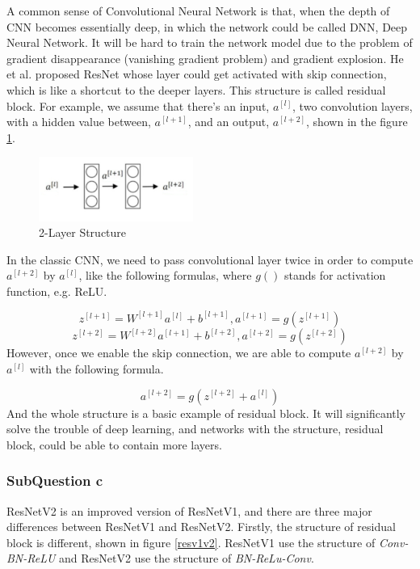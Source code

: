 \documentclass[conference]{IEEEtran}
\begin{document}
A common sense of Convolutional Neural Network is that, when the depth of CNN becomes essentially deep, in which the network could be called DNN, Deep Neural Network. It will be hard to train the network model due to the problem of gradient disappearance (vanishing gradient problem) and gradient explosion. He et al.\cite{resnet} proposed ResNet whose layer could get activated with skip connection, which is like a shortcut to the deeper layers. This structure is called residual block. For example, we assume that there's an input, $a^{[l]}$, two convolution layers, with a hidden value between, $a^{[l+1]}$, and an output, $a^{[l+2]}$, shown in the figure \ref{resex}\cite{wu}.

\begin{figure}[h] 
    \centering
    \includegraphics[width=0.45\textwidth]{./graphs/Task2/resnet-example.png}
    \caption{2-Layer Structure}
    \label{resex}
\end{figure}

In the classic CNN, we need to pass convolutional layer twice in order to compute $a^{[l+2]}$ by $a^{[l]}$, like the following formulas, where $g()$ stands for activation function, e.g. ReLU.

$$z^{[l+1]}=W^{[l+1]}a^{[l]}+b^{[l+1]}, a^{[l+1]}=g(z^{[l+1]})$$
$$z^{[l+2]}=W^{[l+2]}a^{[l+1]}+b^{[l+2]}, a^{[l+2]}=g(z^{[l+2]})$$
However, once we enable the skip connection, we are able to compute $a^{[l+2]}$ by $a^{[l]}$ with the following formula.

$$a^{[l+2]}=g(z^{[l+2]}+a^{[l]})$$
And the whole structure is a basic example of residual block. It will significantly solve the trouble of deep learning, and networks with the structure, residual block, could be able to contain more layers.

\subsubsection{SubQuestion c} %

ResNetV2 is an improved version of ResNetV1, and there are three major differences between ResNetV1 and ResNetV2. Firstly, the structure of residual block is different, shown in figure \ref{resv1v2}.\cite{v1v2} ResNetV1 use the structure of \textit{Conv-BN-ReLU} and ResNetV2 use the structure of \textit{BN-ReLu-Conv}.
\end{document}
